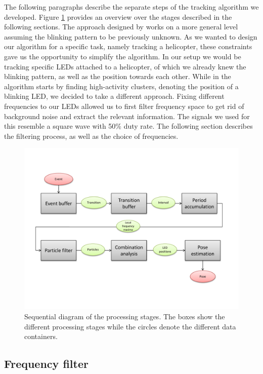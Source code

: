 The following paragraphs describe the separate steps of the tracking algorithm we developed. Figure \ref{img:process_diag} provides an overview over the stages described in the following sections. The approach designed by \cite{Matthias} works on a more general level assuming the blinking pattern to be previously unknown. 
As we wanted to design our algorithm for a specific task, namely tracking a helicopter, these constraints gave us the opportunity to simplify the algorithm. In our setup we would be tracking specific LEDs attached to a helicopter, of which we already knew the blinking pattern, as well as the position towards each other. While in \cite{Matthias} the algorithm starts by finding high-activity clusters, denoting the position of a blinking LED, we decided to take a different approach. Fixing different frequencies to our LEDs allowed us to first filter frequency space to get rid of background noise and extract the relevant information. The signals we used for this resemble a square wave with 50\% duty rate. The following section describes the filtering process, as well as the choice of frequencies.


\begin{figure}[h]
     \centering
     \includegraphics[width=1.0\textwidth]{img/process_diag.pdf}
     \caption{Sequential diagram of the processing stages. The boxes show the different processing stages while the circles denote the different data containers. }
     \label{img:process_diag}
\end{figure}


\subsection{Frequency filter}\label{sec:frequencyfilter}

